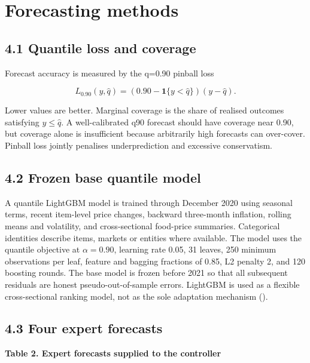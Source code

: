 \section{Forecasting methods}\label{forecasting-methods}

\subsection{4.1 Quantile loss and
coverage}\label{quantile-loss-and-coverage}

Forecast accuracy is measured by the q=0.90 pinball loss

\[
L_{0.90}(y,\widehat q)=\left(0.90-\mathbf{1}\{y<\widehat q\}\right)(y-\widehat q).
\]

Lower values are better. Marginal coverage is the share of realised
outcomes satisfying \(y\leq\widehat q\). A well-calibrated q90 forecast
should have coverage near 0.90, but coverage alone is insufficient
because arbitrarily high forecasts can over-cover. Pinball loss jointly
penalises underprediction and excessive conservatism.

\subsection{4.2 Frozen base quantile
model}\label{frozen-base-quantile-model}

A quantile LightGBM model is trained through December 2020 using
seasonal terms, recent item-level price changes, backward three-month
inflation, rolling means and volatility, and cross-sectional food-price
summaries. Categorical identities describe items, markets or entities
where available. The model uses the quantile objective at
\(\alpha=0.90\), learning rate 0.05, 31 leaves, 250 minimum observations
per leaf, feature and bagging fractions of 0.85, L2 penalty 2, and 120
boosting rounds. The base model is frozen before 2021 so that all
subsequent residuals are honest pseudo-out-of-sample errors. LightGBM is
used as a flexible cross-sectional ranking model, not as the sole
adaptation mechanism ().

\subsection{4.3 Four expert forecasts}\label{four-expert-forecasts}

\textbf{Table 2. Expert forecasts supplied to the controller}

